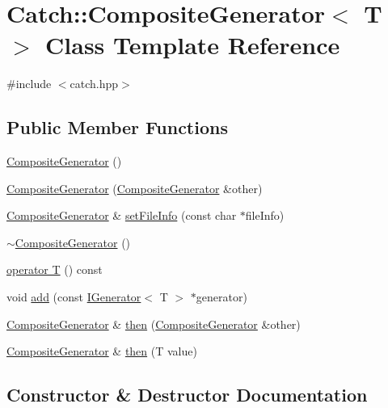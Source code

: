 \hypertarget{class_catch_1_1_composite_generator}{}\section{Catch\+:\+:Composite\+Generator$<$ T $>$ Class Template Reference}
\label{class_catch_1_1_composite_generator}


{\ttfamily \#include $<$catch.\+hpp$>$}

\subsection*{Public Member Functions}
\begin{DoxyCompactItemize}
\item 
\hyperlink{class_catch_1_1_composite_generator_a923398b140371d1783858766864a1af5}{Composite\+Generator} ()
\item 
\hyperlink{class_catch_1_1_composite_generator_a21a7070a00e4a6fe021294c356692692}{Composite\+Generator} (\hyperlink{class_catch_1_1_composite_generator}{Composite\+Generator} \&other)
\item 
\hyperlink{class_catch_1_1_composite_generator}{Composite\+Generator} \& \hyperlink{class_catch_1_1_composite_generator_ac3c57cf4ca5472f440bf71e2936bcd4a}{set\+File\+Info} (const char $\ast$file\+Info)
\item 
\hyperlink{class_catch_1_1_composite_generator_a5766205abd7004c508c20ddbb5e5555e}{$\sim$\+Composite\+Generator} ()
\item 
\hyperlink{class_catch_1_1_composite_generator_a83d6c941e2e735b9528e6e832f7b76e7}{operator T} () const
\item 
void \hyperlink{class_catch_1_1_composite_generator_af3774d42ad2d3453d089ca599efe0517}{add} (const \hyperlink{struct_catch_1_1_i_generator}{I\+Generator}$<$ T $>$ $\ast$generator)
\item 
\hyperlink{class_catch_1_1_composite_generator}{Composite\+Generator} \& \hyperlink{class_catch_1_1_composite_generator_a2e03f42df85cdd238aabd77a80b075d5}{then} (\hyperlink{class_catch_1_1_composite_generator}{Composite\+Generator} \&other)
\item 
\hyperlink{class_catch_1_1_composite_generator}{Composite\+Generator} \& \hyperlink{class_catch_1_1_composite_generator_aefdc11bcfccdf07d2db5f0da3ed8758c}{then} (T value)
\end{DoxyCompactItemize}


\subsection{Constructor \& Destructor Documentation}
\mbox{\label{class_catch_1_1_composite_generator_a923398b140371d1783858766864a1af5}} 
